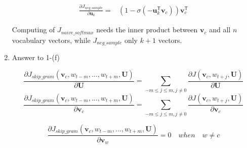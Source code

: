 \documentclass[a4paper]{article}
\begin{document}
\begin{enumerate}
	\begin{equation}
	\begin{split}
	\frac{\partial{J_{neg\_sample}}}{\partial{\mathbf{u}_k}} = &(1-\sigma(-\mathbf{u}_k^{\mathsf{T}}\mathbf{v}_c))\mathbf{v}_{c}^{\mathsf{T}}
	\end{split}
	\end{equation}

	Computing of $J_{naive\_softmax}$ needs the inner product between $\mathbf{v}_c$ and all $n$ vocabulary vectors, while $J_{neg\_sample}$ only $k+1$ vectors.
	\item
	Answer to 1-(f)

	\begin{equation}
	\frac{\partial J_{skip\_gram}(\mathbf{v}_c, w_{t-m},...,w_{t+m}, \mathbf{U})}{\partial \mathbf{U}} = \sum_{-m \leq j \leq m, j \neq 0} \frac{\partial J(\mathbf{v}_c, w_{t+j}, \mathbf{U})}{\partial \mathbf{U}}
	\end{equation}
	\begin{equation}
	\frac{\partial J_{skip\_gram}(\mathbf{v}_c, w_{t-m},...,w_{t+m}, \mathbf{U})}{\partial \mathbf{v}_c} = \sum_{-m \leq j \leq m, j \neq 0} \frac{\partial J(\mathbf{v}_c, w_{t+j}, \mathbf{U})}{\partial \mathbf{v}_c}
	\end{equation}

	\begin{equation}
	\frac{\partial J_{skip\_gram}(\mathbf{v}_c, w_{t-m},...,w_{t+m}, \mathbf{U})}{\partial \mathbf{v}_w} = 0  \quad when \quad w \neq c
	\end{equation}
\end{enumerate}
\end{document}
